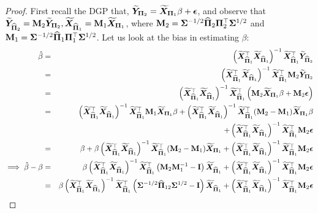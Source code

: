 \documentclass[numsec,webpdf,modern,medium,namedate]{oup-authoring-template}
\theoremstyle{thmstyleone}%
\theoremstyle{thmstyletwo}%
\theoremstyle{thmstylethree}%
\begin{document}
\begin{proof}
    First recall the DGP that, $\widetilde{\boldsymbol{Y}}_{{\boldsymbol{\Pi}}_2} = \widetilde{\boldsymbol{X}}_{{\boldsymbol{\Pi}}_1}\beta + \boldsymbol{\epsilon}$, and observe that  $\widetilde{\boldsymbol{Y}}_{\widehat{\boldsymbol{\Pi}}_2}= \mathbf{M}_2 \widetilde{\boldsymbol{Y}}_{{\boldsymbol{\Pi}}_2}, \widetilde{\boldsymbol{X}}_{\widehat{\boldsymbol{\Pi}}_1}= \mathbf{M}_1 \widetilde{\boldsymbol{X}}_{{\boldsymbol{\Pi}}_1}$, where $\mathbf{M}_2= {\boldsymbol{\Sigma}}^{-{1}/{2}}\widehat{\boldsymbol{\Pi}}_2 \boldsymbol{\Pi}_2^\top {\boldsymbol{\Sigma}}^{{1}/{2}}$ and $\mathbf{M}_1 = {\boldsymbol{\Sigma}}^{-{1}/{2}}\widehat{\boldsymbol{\Pi}}_1 \boldsymbol{\Pi}_1^\top {\boldsymbol{\Sigma}}^{{1}/{2}}$. 
Let us look at the bias in estimating $\beta$:
{
\footnotesize
\begin{eqnarray}\label{eq:betahat-bias}
        \hat{\beta} & = &\left(\widetilde{\bX}_{\hatPi_1}^\top  \widetilde{\bX}_{\hatPi_1}\right)^{-1} \widetilde{\bX}_{\hatPi_1}^\top \widetilde{\bY}_{\hatPi_2} \notag\\
    & = &\left(\widetilde{\bX}_{\hatPi_1}^\top  \widetilde{\bX}_{\hatPi_1}\right)^{-1} \widetilde{\bX}_{\hatPi_1}^\top \bM_2 \widetilde{\bY}_{{\bPi}_2} \notag\\
    & = & \left(\widetilde{\bX}_{\hatPi_1}^\top  \widetilde{\bX}_{\hatPi_1}\right)^{-1} \widetilde{\bX}_{\hatPi_1}^\top \left(\bM_2 \widetilde{\bX}_{{\bPi}_1}\beta + \bM_2 \beps\right) \notag\\ 
    & = & \left(\widetilde{\bX}_{\hatPi_1}^\top  \widetilde{\bX}_{\hatPi_1}\right)^{-1} \widetilde{\bX}_{\hatPi_1}^\top \bM_1 \widetilde{\bX}_{{\bPi}_1} \beta + \left(\widetilde{\bX}_{\hatPi_1}^\top  \widetilde{\bX}_{\hatPi_1}\right)^{-1} \widetilde{\bX}_{\hatPi_1}^\top (\bM_2 -\bM_1)\widetilde{\bX}_{{\bPi}_1}\beta \notag\\
    && + \left(\widetilde{\bX}_{\hatPi_1}^\top  \widetilde{\bX}_{\hatPi_1}\right)^{-1} \widetilde{\bX}_{\hatPi_1}^\top \bM_2 \beps\notag\\
    & = & \beta + \beta \left(\widetilde{\bX}_{\hatPi_1}^\top  \widetilde{\bX}_{\hatPi_1}\right)^{-1} \widetilde{\bX}_{\hatPi_1}^\top (\bM_2 -\bM_1)\widetilde{\bX}_{{\bPi}_1} + \left(\widetilde{\bX}_{\hatPi_1}^\top  \widetilde{\bX}_{\hatPi_1}\right)^{-1}
    \widetilde{\bX}_{\hatPi_1}^\top \bM_2 \beps\notag\\
    \implies \hat{\beta} - \beta & = & \beta \left(\widetilde{\bX}_{\hatPi_1}^\top  \widetilde{\bX}_{\hatPi_1}\right)^{-1} \widetilde{\bX}_{\hatPi_1}^\top \left(\bM_2\bM_1^{-1} -\bI\right)\widetilde{\bX}_{\hatPi_1} + \left(\widetilde{\bX}_{\hatPi_1}^\top  \widetilde{\bX}_{\hatPi_1}\right)^{-1} \widetilde{\bX}_{\hatPi_1}^\top \bM_2 \beps\notag\\
& = & \beta \left(\widetilde{\bX}_{\hatPi_1}^\top  \widetilde{\bX}_{\hatPi_1}\right)^{-1} \widetilde{\bX}_{\hatPi_1}^\top \left(\bSigma^{-{1}/{2}}\hatPi_{12} \bSigma^{{1}/{2}} -\bI\right)\widetilde{\bX}_{\hatPi_1} + \left(\widetilde{\bX}_{\hatPi_1}^\top  \widetilde{\bX}_{\hatPi_1}\right)^{-1} \widetilde{\bX}_{\hatPi_1}^\top \bM_2 \beps\notag\\

\end{eqnarray}}
\end{proof}
\end{document}
